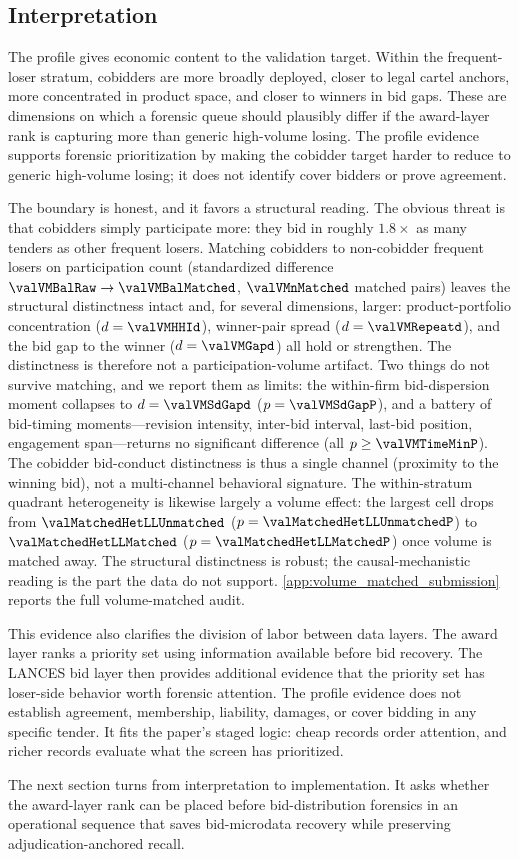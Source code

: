 \subsection{Interpretation}
\label{sec:cobidder_interpretation}

The profile gives economic content to the validation target.
Within the frequent-loser stratum, cobidders are more broadly
deployed, closer to legal cartel anchors, more concentrated in
product space, and closer to winners in bid gaps. These are
dimensions on which a forensic queue should plausibly differ if
the award-layer rank is capturing more than generic high-volume
losing.
The profile evidence supports forensic prioritization by making
the cobidder target harder to reduce to generic high-volume
losing; it does not identify cover bidders or prove agreement.

The boundary is honest, and it favors a structural reading. The
obvious threat is that cobidders simply participate more: they bid
in roughly $1.8\times$ as many tenders as other frequent losers.
Matching cobidders to non-cobidder frequent losers on participation
count (standardized difference $\valVMBalRaw\rightarrow\valVMBalMatched$,
$\valVMnMatched$ matched pairs) leaves the structural distinctness
intact and, for several dimensions, larger: product-portfolio
concentration ($d=\valVMHHId$), winner-pair spread
($d=\valVMRepeatd$), and the bid gap to the winner
($d=\valVMGapd$) all hold or strengthen. The distinctness is
therefore not a participation-volume artifact. Two things do not
survive matching, and we report them as limits: the within-firm
bid-dispersion moment collapses to $d=\valVMSdGapd$
($p=\valVMSdGapP$), and a battery of bid-timing moments---revision
intensity, inter-bid interval, last-bid position, engagement
span---returns no significant difference (all $p\geq\valVMTimeMinP$).
The cobidder bid-conduct distinctness is thus a single channel
(proximity to the winning bid), not a multi-channel behavioral
signature. The within-stratum quadrant heterogeneity is likewise
largely a volume effect: the largest cell drops from
$\valMatchedHetLLUnmatched$ ($p=\valMatchedHetLLUnmatchedP$) to
$\valMatchedHetLLMatched$ ($p=\valMatchedHetLLMatchedP$) once volume
is matched away. The structural distinctness is robust; the
causal-mechanistic reading is the part the data do not support.
\ref{app:volume_matched_submission} reports the full volume-matched
audit.

This evidence also clarifies the division of labor between data
layers. The award layer ranks a priority set using
information available before bid recovery. The LANCES bid layer
then provides additional evidence that the priority set has
loser-side behavior worth forensic attention. The profile
evidence does not establish
agreement, membership, liability, damages, or cover bidding in
any specific tender. It fits the paper's staged logic: cheap
records order attention, and richer records evaluate what the
screen has prioritized.

The next section turns from interpretation to implementation. It
asks whether the award-layer rank can be placed before
bid-distribution forensics in an operational sequence that saves
bid-microdata recovery while preserving adjudication-anchored
recall.
